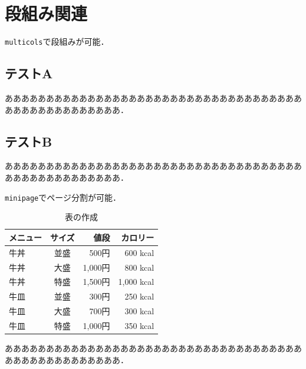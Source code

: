 \documentclass[11pt]{ltjsarticle}
\begin{document}
\section{段組み関連}

\verb|multicols|で段組みが可能．

\begin{multicols}{2}
\subsection{テストA}
ああああああああああああああああああああああああああああああああああああああああああああああああああ．
\subsection{テストB}
ああああああああああああああああああああああああああああああああああああああああああああああああああ．
\end{multicols}

\verb|minipage|でページ分割が可能．

\begin{minipage}{0.6\textwidth}
\begin{table}[H]
  \caption{表の作成}
  \label{table:text}
  \centering
  \begin{tabular}{l|crr}
    \hline 
    メニュー & サイズ & 値段 & カロリー \\ \hline 
    牛丼 & 並盛 & 500円 & 600 kcal \\
    牛丼 & 大盛 & 1,000円 & 800 kcal \\
    牛丼 & 特盛 & 1,500円 & 1,000 kcal \\ \hline
    牛皿 & 並盛 & 300円 & 250 kcal \\
    牛皿 & 大盛 & 700円 & 300 kcal \\
    牛皿 & 特盛 & 1,000円 & 350 kcal \\
    \hline
  \end{tabular}
\end{table}
\end{minipage}
\hfill
\begin{minipage}{0.35\textwidth}
    ああああああああああああああああああああああああああああああああああああああああああああああああああ．
\end{minipage}
\end{document}
